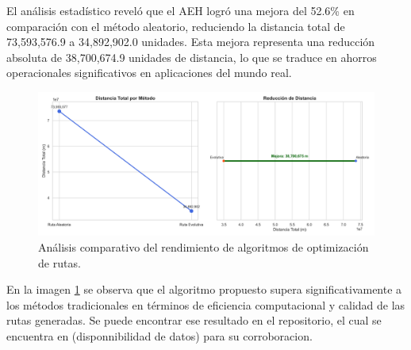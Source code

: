\documentclass[conference]{IEEEtran}
\begin{document}
\begin{table}[H]
\centering
\caption{Resultados Comparativos de Rendimiento}
\label{tab:performance_comparison}
\end{table}
El análisis estadístico reveló que el AEH logró una mejora del 52.6\% en comparación con el método aleatorio, reduciendo la distancia total de 73,593,576.9 a 34,892,902.0 unidades. Esta mejora representa una reducción absoluta de 38,700,674.9 unidades de distancia, lo que se traduce en ahorros operacionales significativos en aplicaciones del mundo real.

\begin{figure}[H]
\centering
\includegraphics[width=\columnwidth]{comparacion_rutas_mejorado.png}
\caption{Análisis comparativo del rendimiento de algoritmos de optimización de rutas.}
\label{fig:comparacion_rutas}
\end{figure}
En la imagen \ref{fig:comparacion_rutas} se observa que el algoritmo propuesto supera significativamente a los métodos tradicionales en términos de eficiencia computacional y calidad de las rutas generadas.
Se puede encontrar ese resultado en el repositorio, el cual se encuentra en (disponnibilidad de datos) para su corroboracion.
\end{document}
